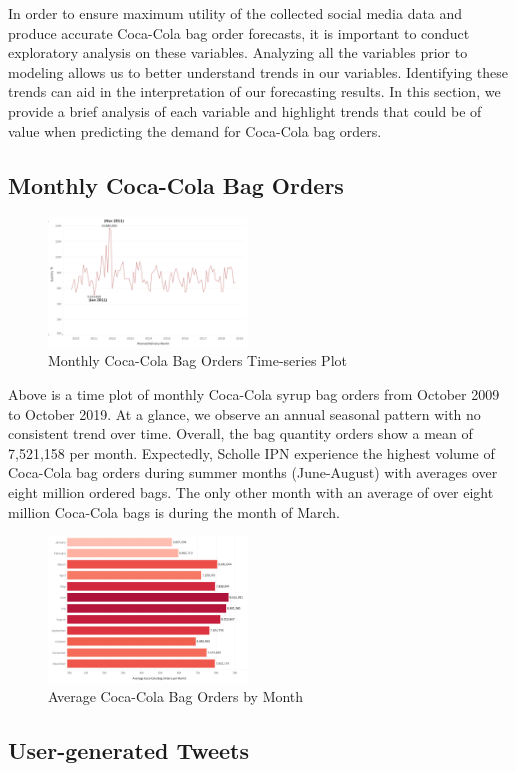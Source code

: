 \documentclass[12pt,oneside]{chicagocapstone}
\begin{document}
In order to ensure maximum utility of the collected social media data and produce accurate Coca-Cola bag order forecasts, it is important to conduct exploratory analysis on these variables. Analyzing all the variables prior to modeling allows us to better understand trends in our variables. Identifying these trends can aid in the interpretation of our forecasting results. In this section, we provide a brief analysis of each variable and highlight trends that could be of value when predicting the demand for Coca-Cola bag orders.

\hypertarget{monthly-coca-cola-bag-orders}{%
\subsection*{Monthly Coca-Cola Bag Orders}\label{monthly-coca-cola-bag-orders}}
\begin{figure}

{\centering \includegraphics[width=200px,angle = 0, scale=1.5]{figure/TSCoke} 

}

\caption{Monthly Coca-Cola Bag Orders Time-series Plot}\label{fig:TSCoke}
\end{figure}
Above is a time plot of monthly Coca-Cola syrup bag orders from October 2009 to October 2019. At a glance, we observe an annual seasonal pattern with no consistent trend over time. Overall, the bag quantity orders show a mean of 7,521,158 per month. Expectedly, Scholle IPN experience the highest volume of Coca-Cola bag orders during summer months (June-August) with averages over eight million ordered bags. The only other month with an average of over eight million Coca-Cola bags is during the month of March.
\begin{figure}

{\centering \includegraphics[width=200px,angle = 0, scale=1.5]{figure/AveCokeBagOrderPerMonth} 

}

\caption{Average Coca-Cola Bag Orders by Month}\label{fig:AveCokeBagOrderPerMonth}
\end{figure}
\hypertarget{user-generated-tweets}{%
\subsection*{User-generated Tweets}\label{user-generated-tweets}}
\end{document}
